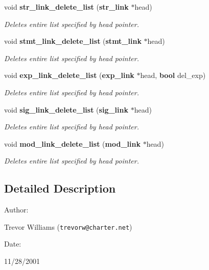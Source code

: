 \begin{CompactItemize}
void {\bf str\_\-link\_\-delete\_\-list} ({\bf str\_\-link} $\ast$head)
\begin{CompactList}\small\item\em Deletes entire list specified by head pointer.\item\end{CompactList}\item 
void {\bf stmt\_\-link\_\-delete\_\-list} ({\bf stmt\_\-link} $\ast$head)
\begin{CompactList}\small\item\em Deletes entire list specified by head pointer.\item\end{CompactList}\item 
void {\bf exp\_\-link\_\-delete\_\-list} ({\bf exp\_\-link} $\ast$head, {\bf bool} del\_\-exp)
\begin{CompactList}\small\item\em Deletes entire list specified by head pointer.\item\end{CompactList}\item 
void {\bf sig\_\-link\_\-delete\_\-list} ({\bf sig\_\-link} $\ast$head)
\begin{CompactList}\small\item\em Deletes entire list specified by head pointer.\item\end{CompactList}\item 
void {\bf mod\_\-link\_\-delete\_\-list} ({\bf mod\_\-link} $\ast$head)
\begin{CompactList}\small\item\em Deletes entire list specified by head pointer.\item\end{CompactList}\end{CompactItemize}


\subsection{Detailed Description}


\begin{Desc}
\item[Author: ]\par
Trevor Williams ({\tt trevorw@charter.net}) \end{Desc}
\begin{Desc}
\item[Date: ]\par
11/28/2001\end{Desc}


